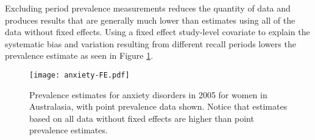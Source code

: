 Excluding period prevalence measurements reduces the quantity of data and produces results that are generally much lower than estimates using all of the data without fixed effects.  Using a fixed effect study-level covariate to explain the systematic bias and variation resulting from different recall periods lowers the prevalence estimate as seen in Figure \ref{fig:app-anxiety FE}.

    \begin{figure}[h]
        \begin{center}
            \texttt{[image: anxiety-FE.pdf]}
            \caption{Prevalence estimates for anxiety disorders in 2005 for women in Australasia, with point prevalence data shown.  Notice that estimates based on all data without fixed effects are higher than point prevalence estimates.}
            \label{fig:app-anxiety FE}
        \end{center}
    \end{figure}

